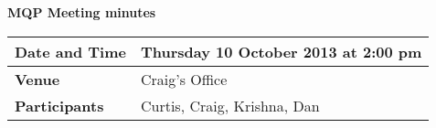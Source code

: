 \documentclass[a4wide,10pt]{extarticle}
\begin{document}
\thispagestyle{empty}

\begin{center}
\textbf{MQP Meeting minutes}
\vspace{0.33cm}
\end{center}

\begin{center}
\begin{tabular}{| m{2.8cm} | m{13.6cm} |} \hline
\textbf{Date and Time} & Thursday 10 October 2013 at 2:00 pm \\ \hline
\textbf{Venue} & Craig's Office \\ \hline
\textbf{Participants} & Curtis, Craig, Krishna, Dan\\ \hline
\end{tabular}
\end{center}
\end{document}
